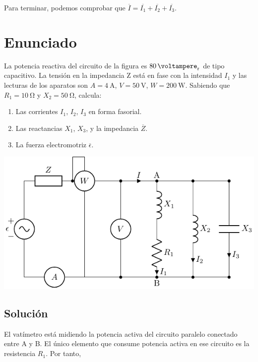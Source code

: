 Para terminar, podemos comprobar que $\overline{I} = \overline{I_1}
+ \overline{I_2} + \overline{I_3}$.


\section{Enunciado}

La potencia reactiva del circuito de la figura es $\qty{80}{\voltampere_r}$ de tipo capacitivo. La tensión en la impedancia Z está en fase con la intensidad $I_1$ y las lecturas de los aparatos son $A = \qty{4}{\ampere}$, $V = \qty{50}{\volt}$, $W = \qty{200}{\watt}$. Sabiendo que $R_1 = \qty{10}{\ohm}$ y $X_2 = \qty{50}{\ohm}$, calcula:

\begin{enumerate}
\item Las corrientes $I_1$, $I_2$, $I_3$ en forma fasorial.
\item Las reactancias $X_1$, $X_3$, y la impedancia $\overline{Z}$.
\item La fuerza electromotriz $\overline{\epsilon}$.
\end{enumerate}
\begin{center}
  \includegraphics{figuras/BT2_circuitoCapacitivo}
\end{center}

\subsection*{Solución}


El vatímetro está midiendo la potencia activa del circuito paralelo conectado entre A y B. El único elemento que consume potencia activa en ese circuito es la resistencia $R_1$. Por tanto,

